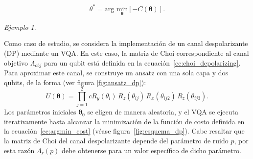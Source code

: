 \documentclass[letterpaper,12pt]{thesisECFM}
\theoremstyle{plain}
\theoremstyle{definition}
\theoremstyle{definition}
\theoremstyle{remark}
\newcommand{\1}{\mathbb{1}}
\newtheorem{ex}{Ejemplo}[section]
\begin{document}
\begin{equation}
    \label{ec:argmin_cost}
    \theta^* =  \text{arg }\underset{\bm{\theta}}{\text{min}} [ - C(\bm{\theta})].
\end{equation}
\begin{ex}\label{ex:depolarizing}\end{ex}
Como caso de estudio, se considera la implementación de un canal despolarizante (DP) mediante un VQA. En este caso, la matriz de Choi correspondiente al canal objetivo $\Lambda_{obj}$ para un qubit está definida en la ecuación~\ref{ec:choi_depolarizing}. Para aproximar este canal, se construye un ansatz con una sola capa y dos qubits, de la forma (ver figura \ref{fig:ansatz_dp}):
\begin{equation}
    U(\bm{\theta}) = \prod_{j=1}^2 cR_y(\theta_i)\, R_z(\theta_{ij})\, R_x(\theta_{ij2})\, R_z(\theta_{ij3}).
\end{equation}
Los parámetros iniciales $\bm{\theta}_0$ se eligen de manera aleatoria, y el VQA se ejecuta iterativamente hasta alcanzar la minimización de la función de costo definida en la ecuación~\ref{ec:argmin_cost} (véase figura~\ref{fig:esquema_dp}). Cabe resaltar que la matriz de Choi del canal despolarizante depende del parámetro de ruido $p$, por esta razón $\Lambda_r(p)$ debe obtenerse para un valor específico de dicho parámetro.
\end{document}
